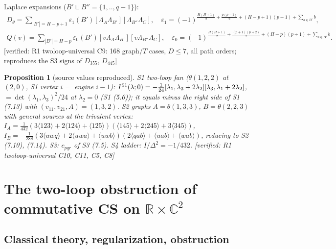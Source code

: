 \documentclass[10pt,a4paper]{article}
\numberwithin{equation}{section}
\newtheorem{proposition}[theorem]{Proposition}
\theoremstyle{definition}
\theoremstyle{remark}
\newcommand{\ver}[1]{\textup{[verified: #1]}}
\begin{document}
Laplace expansions ($B'\sqcup B''=\{1,..,q-1\}$):
\begin{gather}
D_\theta=\sum_{|B'|=H-p+1}\varepsilon_1(B')[\Lambda_A\Lambda_{B'}][\Lambda_{B''}\Lambda_C],\quad \varepsilon_1=(-1)^{\frac{H(H+1)}2+\frac{p(p-1)}2+(H-p+1)(p-1)+\sum_{b\in B'}b},\\
Q(v)=\sum_{|B'|=H-p}\varepsilon_0(B')[v\Lambda_A\Lambda_{B'}][v\Lambda_{B''}\Lambda_C],\quad \varepsilon_0=(-1)^{\frac{H(H+1)}2+\frac{(p+1)(p+2)}2+(H-p)(p+1)+\sum_{b\in B'}b}.
\end{gather}
\ver{R1 twoloop-universal C9: 168 graph/$T$ cases, $D\le7$, all path orders; reproduces the S3 signs of $D_{355}$, $D_{445}$}

\begin{proposition}[source values reproduced]\label{prop-sourcevals}
S1 two-loop fan ($\theta(1,2,2)$ at $(2,0)$, S1 vertex $i=$ engine $i-1$): $I^{\rm S1}(\lambda;0)=-\frac1{24}[\lambda_1,\lambda_3+2\lambda_2][\lambda_3,\lambda_1+2\lambda_2]$, $=\det(\lambda_1,\lambda_3)^2/24$ at $\lambda_2=0$ (S1 (5.6)); it equals minus the right side of S1 (7.13) with $(v_{11},v_{21},A)=(1,3,2)$. S2 graphs $A=\theta(1,3,3)$, $B=\theta(2,2,3)$ with general sources at the trivalent vertex: $I_A=\frac1{432}(3\langle123\rangle+2\langle124\rangle+\langle125\rangle)(\langle145\rangle+2\langle245\rangle+3\langle345\rangle)$, $I_B=-\frac1{288}(3\langle uwq\rangle+2\langle uwa\rangle+\langle uwb\rangle)(2\langle qab\rangle+\langle uab\rangle+\langle wab\rangle)$, reducing to S2 (7.10), (7.14). S3: $c_{pqr}$ of S3 (7.5). S4 ladder: $I/\Delta^2=-1/432$.
\ver{R1 twoloop-universal C10, C11, C5, C8}
\end{proposition}

\section{\texorpdfstring{The two-loop obstruction of commutative CS on $\mathbb R\times\mathbb C^2$}{The two-loop obstruction of commutative CS on R x C2}}\label{sec-obs}

\subsection{Classical theory, regularization, obstruction}\label{sec-classical}
\end{document}
